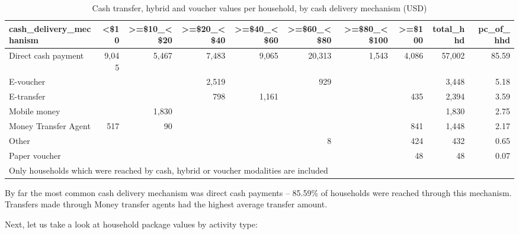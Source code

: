 \documentclass[
]{article}
\begin{document}
\begin{table}

\caption{\label{tab:table-usd-hhd-bin-frequency}Cash transfer, hybrid and voucher values per household, by cash delivery mechanism (USD)}
\centering
\begin{tabular}[t]{l|r|r|r|r|r|r|r|r|r}
\hline
cash\_delivery\_mechanism & <\$10 & >=\$10\_<\$20 & >=\$20\_<\$40 & >=\$40\_<\$60 & >=\$60\_<\$80 & >=\$80\_<\$100 & >=\$100 & total\_hhd & pc\_of\_hhd\\
\hline
Direct cash payment & 9,045 & 5,467 & 7,483 & 9,065 & 20,313 & 1,543 & 4,086 & 57,002 & 85.59\\
\hline
E-voucher &  &  & 2,519 &  & 929 &  &  & 3,448 & 5.18\\
\hline
E-transfer &  &  & 798 & 1,161 &  &  & 435 & 2,394 & 3.59\\
\hline
Mobile money &  & 1,830 &  &  &  &  &  & 1,830 & 2.75\\
\hline
Money Transfer Agent & 517 & 90 &  &  &  &  & 841 & 1,448 & 2.17\\
\hline
Other &  &  &  &  & 8 &  & 424 & 432 & 0.65\\
\hline
Paper voucher &  &  &  &  &  &  & 48 & 48 & 0.07\\
\hline
\multicolumn{10}{l}{\rule{0pt}{1em}Only households which were reached by cash, hybrid or voucher modalities are included}\\
\end{tabular}
\end{table}

By far the most common cash delivery mechanism was direct cash payments
-- 85.59\% of households were reached through this mechanism. Transfers
made through Money transfer agents had the highest average transfer
amount.

Next, let us take a look at household package values by activity type:
\end{document}

